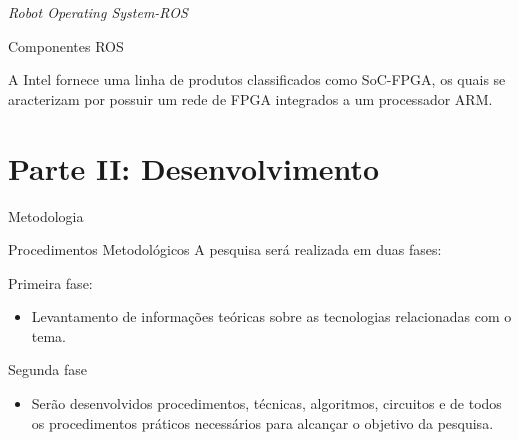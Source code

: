 \documentclass[10pt]{beamer}
\begin{document}
\begin{frame}{\textit{Robot Operating System-ROS}}
	\begin{alertblock}{Componentes ROS}
		\vspace{0.1cm}
		\begin{justify}
			A Intel fornece uma linha de produtos classificados como SoC-FPGA, os quais se aracterizam por possuir um rede de FPGA integrados a um processador ARM.
		\end{justify}
		

	\end{alertblock}
\end{frame}


\section{Parte II: Desenvolvimento}

\begin{frame}{Metodologia}
    \begin{alertblock}{Procedimentos Metodológicos}
        A pesquisa será realizada em duas fases:
        \begin{block}{Primeira fase:}
            \begin{itemize}
                \item Levantamento de informações teóricas sobre as tecnologias relacionadas com o tema.
            \end{itemize}
        \end{block}
    
        \begin{block}{Segunda fase}
            \begin{itemize}
                \item Serão desenvolvidos procedimentos, técnicas, algoritmos, circuitos e de todos os procedimentos práticos necessários para alcançar o objetivo da pesquisa.
            \end{itemize}
        \end{block}
    \end{alertblock}

  
\end{frame}
\end{document}
